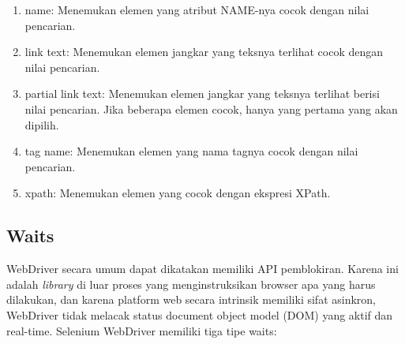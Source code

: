 \begin{enumerate}
	\item name: Menemukan elemen yang atribut NAME-nya cocok dengan nilai pencarian. 
	\item link text: Menemukan elemen jangkar yang teksnya terlihat cocok dengan nilai pencarian. 
	\item partial link text: Menemukan elemen jangkar yang teksnya terlihat berisi nilai pencarian. Jika beberapa elemen cocok, hanya yang pertama yang akan dipilih.
	\item tag name: Menemukan elemen yang nama tagnya cocok dengan nilai pencarian.
	\item xpath: Menemukan elemen yang cocok dengan ekspresi XPath.
\end{enumerate}


\subsection{Waits}
WebDriver secara umum dapat dikatakan memiliki API pemblokiran. Karena ini adalah \textit{library} di luar proses yang menginstruksikan browser apa yang harus dilakukan, dan karena platform web secara intrinsik memiliki sifat asinkron, WebDriver tidak melacak status document object model (DOM) yang aktif dan real-time. Selenium WebDriver memiliki tiga tipe waits:
